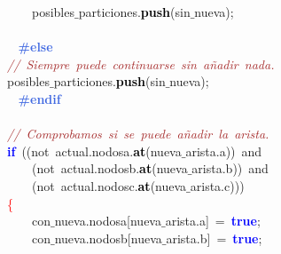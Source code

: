 \mbox{}\ \ \ \ \ \ \ \ \ \ \ \ \ \ \ \ posibles$\_$particiones\textcolor{BrickRed}{.}\textbf{\textcolor{Black}{push}}\textcolor{BrickRed}{(}sin$\_$nueva\textcolor{BrickRed}{);} \\
\mbox{} \\
\mbox{}\textbf{\textcolor{RoyalBlue}{\ \ \ \ \ \ \ \ \ \ \ \ \#else}} \\
\mbox{}\ \ \ \ \ \ \ \ \ \ \ \ \textit{\textcolor{Brown}{//\ Siempre\ puede\ continuarse\ sin\ añadir\ nada.}} \\
\mbox{}\ \ \ \ \ \ \ \ \ \ \ \ posibles$\_$particiones\textcolor{BrickRed}{.}\textbf{\textcolor{Black}{push}}\textcolor{BrickRed}{(}sin$\_$nueva\textcolor{BrickRed}{);} \\
\mbox{}\textbf{\textcolor{RoyalBlue}{\ \ \ \ \ \ \ \ \ \ \ \ \#endif}} \\
\mbox{} \\
\mbox{}\ \ \ \ \ \ \ \ \ \ \ \ \textit{\textcolor{Brown}{//\ Comprobamos\ si\ se\ puede\ añadir\ la\ arista.}} \\
\mbox{}\ \ \ \ \ \ \ \ \ \ \ \ \textbf{\textcolor{Blue}{if}}\ \textcolor{BrickRed}{((}\textcolor{TealBlue}{not}\ actual\textcolor{BrickRed}{.}nodosa\textcolor{BrickRed}{.}\textbf{\textcolor{Black}{at}}\textcolor{BrickRed}{(}nueva$\_$arista\textcolor{BrickRed}{.}a\textcolor{BrickRed}{))}\ and \\
\mbox{}\ \ \ \ \ \ \ \ \ \ \ \ \ \ \ \ \textcolor{BrickRed}{(}\textcolor{TealBlue}{not}\ actual\textcolor{BrickRed}{.}nodosb\textcolor{BrickRed}{.}\textbf{\textcolor{Black}{at}}\textcolor{BrickRed}{(}nueva$\_$arista\textcolor{BrickRed}{.}b\textcolor{BrickRed}{))}\ and \\
\mbox{}\ \ \ \ \ \ \ \ \ \ \ \ \ \ \ \ \textcolor{BrickRed}{(}\textcolor{TealBlue}{not}\ actual\textcolor{BrickRed}{.}nodosc\textcolor{BrickRed}{.}\textbf{\textcolor{Black}{at}}\textcolor{BrickRed}{(}nueva$\_$arista\textcolor{BrickRed}{.}c\textcolor{BrickRed}{)))} \\
\mbox{}\ \ \ \ \ \ \ \ \ \ \ \ \textcolor{Red}{\{} \\
\mbox{}\ \ \ \ \ \ \ \ \ \ \ \ \ \ \ \ con$\_$nueva\textcolor{BrickRed}{.}nodosa\textcolor{BrickRed}{[}nueva$\_$arista\textcolor{BrickRed}{.}a\textcolor{BrickRed}{]}\ \textcolor{BrickRed}{=}\ \textbf{\textcolor{Blue}{true}}\textcolor{BrickRed}{;} \\
\mbox{}\ \ \ \ \ \ \ \ \ \ \ \ \ \ \ \ con$\_$nueva\textcolor{BrickRed}{.}nodosb\textcolor{BrickRed}{[}nueva$\_$arista\textcolor{BrickRed}{.}b\textcolor{BrickRed}{]}\ \textcolor{BrickRed}{=}\ \textbf{\textcolor{Blue}{true}}\textcolor{BrickRed}{;} \\
